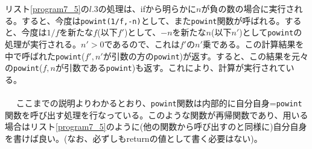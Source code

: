 リスト\ref{program7_5}の$l$.3の処理は、ifから明らかに$n$が負の数の場合に実行される。すると、今度は\verb|powint(1/f,-n)|として、また\verb|powint|関数が呼ばれる。すると、今度は$1/f$を新たな$f$(以下$f'$)として、$-n$を新たな$n$(以下$n'$)として\verb|powint|の処理が実行される。$n'>0$であるので、これは$f'$の$n'$乗である。この計算結果を中で呼ばれた\verb|powint|($f',n'$が引数の方の\verb|powint|)が返す。すると、この結果を元々の\verb|powint|($f,n$が引数である\verb|powint|)も返す。これにより、計算が実行されている。
\\ \\　
ここまでの説明よりわかるとおり、\verb|powint|関数は内部的に自分自身=\verb|powint|関数を呼び出す処理を行なっている。このような関数が再帰関数であり、用いる場合はリスト\ref{program7_5}のように(他の関数から呼び出すのと同様に)自分自身を書けば良い。(なお、必ずしもreturnの値として書く必要はない)。

